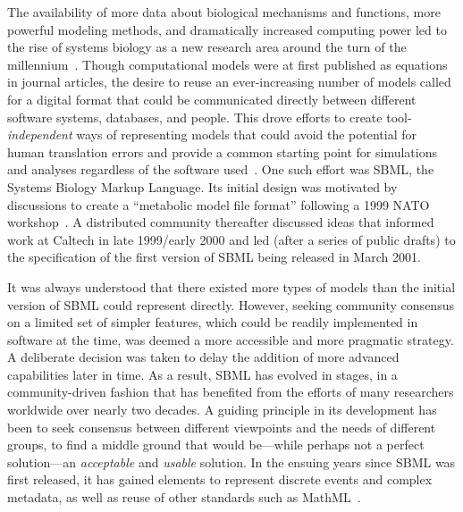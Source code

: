 \documentclass[]{draft-sbml-paper}
\begin{document}
The availability of more data about biological mechanisms and functions, more powerful modeling methods, and dramatically increased computing power led to the rise of systems biology as a new research area around the turn of the millennium~\citep{kitano2000perspectives, ideker2001new}. Though computational models were at first published as equations in journal articles, the desire to reuse an ever-increasing number of models called for a digital format that could be communicated directly between different software systems, databases, and people. This drove efforts to create tool-\emph{independent} ways of representing models that could avoid the potential for human translation errors and provide a common starting point for simulations and analyses regardless of the software used~\citep{Lloyd2004-fd, Goddard2001-ix, hucka_2001}. One such effort was SBML, the Systems Biology Markup Language. Its initial design was motivated by discussions to create a ``metabolic model file format'' following a 1999 NATO workshop~\citep{Cornish-Bowden2000technological}. A distributed community thereafter discussed ideas that informed work at Caltech in late 1999/early 2000 and led (after a series of public drafts) to the specification of the first version of SBML being released in March 2001.


It was always understood that there existed more types of models than the initial version of SBML could represent directly. However, seeking community consensus on a limited set of simpler features, which could be readily implemented in software at the time, was deemed a more accessible and more pragmatic strategy. A deliberate decision was taken to delay the addition of more advanced capabilities later in time. As a result, SBML has evolved in stages, in a community-driven fashion that has benefited from the efforts of many researchers worldwide over nearly two decades. A guiding principle in its development has been to seek consensus between different viewpoints and the needs of different groups, to find a middle ground that would be---while perhaps not a perfect solution---an \emph{acceptable} and \emph{usable} solution. In the ensuing years since SBML was first released, it has gained elements to represent discrete events and complex metadata, as well as reuse of other standards such as MathML~\citep{ausbrooks2003mathematical}.
\end{document}
